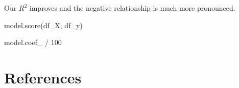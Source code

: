 \documentclass[
  letterpaper,
  DIV=11,
  numbers=noendperiod]{scrreprt}
\newenvironment{Shaded}{\begin{snugshade}}{\end{snugshade}}
\newcommand{\DecValTok}[1]{\textcolor[rgb]{0.68,0.00,0.00}{#1}}
\newcommand{\NormalTok}[1]{\textcolor[rgb]{0.00,0.23,0.31}{#1}}
\newcommand{\OperatorTok}[1]{\textcolor[rgb]{0.37,0.37,0.37}{#1}}
\newlength{\cslhangindent}
\newlength{\cslentryspacingunit} %
\newenvironment{CSLReferences}[2] %
 {%
  \setlength{\parindent}{0pt}
  \ifodd #1
  \let\oldpar\par
  \def\par{\hangindent=\cslhangindent\oldpar}
  \fi
  \setlength{\parskip}{#2\cslentryspacingunit}
 }%
 {}
\begin{document}
Our \(R^2\) improves and the negative relationship is much more
pronounced.

\begin{Shaded}
\begin{Highlighting}[]
\NormalTok{model.score(df\_X, df\_y)}
\end{Highlighting}
\end{Shaded}

\begin{Shaded}
\begin{Highlighting}[]
\NormalTok{model.coef\_ }\OperatorTok{/} \DecValTok{100}
\end{Highlighting}
\end{Shaded}


\hypertarget{references-1}{%
\chapter*{References}\label{references-1}}


\hypertarget{refs}{}
\begin{CSLReferences}{0}{0}
\end{CSLReferences}
\end{document}
